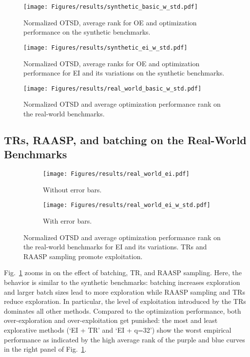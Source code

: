 \documentclass[accepted]{uai2025}
\begin{document}
\begin{figure}[H]
    \centering
    \texttt{[image: Figures/results/synthetic\_basic\_w\_std.pdf]}
    \caption{Normalized \ac{OTSD}, average rank for \ac{OE} and optimization performance on the synthetic benchmarks.}
\end{figure}

\begin{figure}[tb]
    \centering
    \texttt{[image: Figures/results/synthetic\_ei\_w\_std.pdf]}
    \caption{Normalized \ac{OTSD}, average ranks for \ac{OE} and optimization performance for \ac{EI} and its variations on the synthetic benchmarks.}
\end{figure}

\begin{figure}[tb]
    \centering
    \texttt{[image: Figures/results/real\_world\_basic\_w\_std.pdf]}
    \caption{Normalized \ac{OTSD} and average optimization performance rank on the real-world benchmarks.}
\end{figure}



\subsection{TRs, RAASP, and batching on the Real-World Benchmarks}
\label{app:trs-raasp-batching-real-world}

\begin{figure}[H]
    \centering
    \begin{subfigure}{0.48\linewidth}
    \texttt{[image: Figures/results/real\_world\_ei.pdf]}
    \caption{Without error bars.}
    \end{subfigure}
    \begin{subfigure}{0.48\linewidth}
    \texttt{[image: Figures/results/real\_world\_ei\_w\_std.pdf]}
    \caption{With error bars.}
    \end{subfigure}
    \caption{Normalized \ac{OTSD} and average optimization performance rank on the real-world benchmarks for \ac{EI} and its variations. \acp{TR} and \ac{RAASP} sampling promote exploitation.}
    \label{fig:rw_benchmarks_basic_ei}
\end{figure}

Fig.~\ref{fig:rw_benchmarks_basic_ei} zooms in on the effect of batching, \ac{TR}, and \ac{RAASP} sampling.
Here, the behavior is similar to the synthetic benchmarks: batching increases exploration and larger batch sizes lead to more exploration while \ac{RAASP} sampling and \acp{TR} reduce exploration.
In particular, the level of exploitation introduced by the \acp{TR} dominates all other methods. 
Compared to the optimization performance, both over-exploration and over-exploitation get punished: the most and least explorative methods (`EI + TR' and `EI + q=32') show the worst empirical performance as indicated by the high average rank of the purple and blue curves in the right panel of Fig.~\ref{fig:rw_benchmarks_basic_ei}.
\end{document}
